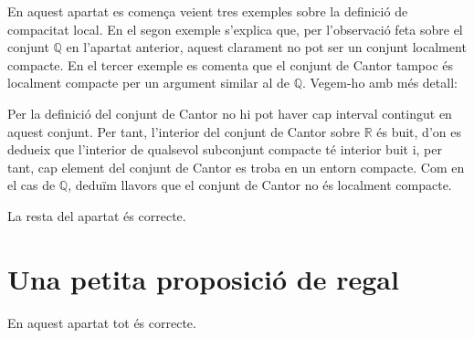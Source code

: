 \documentclass{article}
\begin{document}
En aquest apartat es comença veient tres exemples sobre la definició de compacitat local. En el segon exemple s'explica que, per l'observació feta sobre el conjunt $\mathbb{Q}$ en l'apartat anterior, aquest clarament no pot ser un conjunt localment compacte. En el tercer exemple es comenta que el conjunt de Cantor tampoc és localment compacte per un argument similar al de $\mathbb{Q}$. Vegem-ho amb més detall:

Per la definició del conjunt de Cantor no hi pot haver cap interval contingut en aquest conjunt. Per tant, l'interior del conjunt de Cantor sobre $\mathbb{R}$ és buit, d'on es dedueix que l'interior de qualsevol subconjunt compacte té interior buit i, per tant, cap element del conjunt de Cantor es troba en un entorn compacte. Com en el cas de $\mathbb{Q}$, deduïm llavors que el conjunt de Cantor no és localment compacte.
\par
La resta del apartat és correcte.
\section{Una petita proposició de regal}
En aquest apartat tot és correcte.
\end{document}
